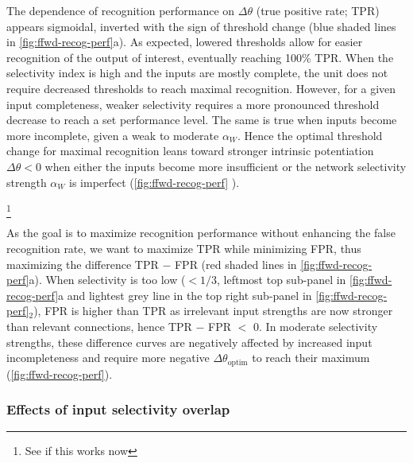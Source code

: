 The dependence of recognition performance on $\Delta\theta$ (true positive rate; TPR)
    appears sigmoidal, inverted with the sign of threshold change
        (blue shaded lines in \autoref{fig:ffwd-recog-perf}a).
    As expected, lowered thresholds allow for easier recognition of the output of interest, eventually reaching 100\% TPR.
    When the selectivity index is high and the inputs are mostly complete, the unit does not require decreased thresholds to reach maximal recognition.
    However, for a given input completeness, weaker selectivity requires a more pronounced threshold decrease to reach a set performance level.
    The same is true when inputs become more incomplete, given a weak to moderate $\alpha_W$.
    Hence the optimal threshold change for maximal recognition leans toward stronger intrinsic potentiation $\Delta \theta < 0$
        when either the inputs become more insufficient or the network selectivity strength $\alpha_W$ is imperfect (\autoref{fig:ffwd-recog-perf}
        ).

\footnote{See if this works now}

As the goal is to maximize recognition performance without enhancing the false recognition rate,
        we want to maximize TPR while minimizing FPR,
        thus maximizing the difference TPR $-$ FPR
        (red shaded lines in \autoref{fig:ffwd-recog-perf}a).
    When selectivity is too low
        ($ < 1/3$, leftmost top sub-panel in \autoref{fig:ffwd-recog-perf}a
        and lightest grey line in the top right sub-panel in
        \autoref{fig:ffwd-recog-perf}$_2$),
        FPR is higher than TPR as irrelevant input strengths are now stronger than relevant connections,
        hence TPR $-$ FPR $<$ 0.
    In moderate selectivity strengths, these difference curves are negatively affected by increased input incompleteness
        and require more negative $\Delta \theta_{\mathrm{optim}}$ to reach their maximum
        (\autoref{fig:ffwd-recog-perf}).

\subsubsection*{Effects of input selectivity overlap}

